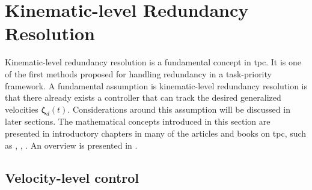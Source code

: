 
\section{Kinematic-level Redundancy Resolution}

Kinematic-level redundancy resolution is a fundamental concept in \gls{tpc}.
It is one of the first methods proposed for handling redundancy in a task-priority framework.
A fundamental assumption is kinematic-level redundancy resolution is that there
already exists a controller that can track the desired generalized velocities
\(\bm{\zeta}_d(t)\).
Considerations around this assumption will be discussed in later sections.
The mathematical concepts introduced in this section are presented in introductory
chapters in many of the articles and books on \gls{tpc}, such as
\cite{hanafusa1981}, \cite{nakamura1987}, \cite{khatib1987}. An overview is
presented in \cite{chiaverini1997}.

\subsection{Velocity-level control}
\label{sec:velocity_level_control}

